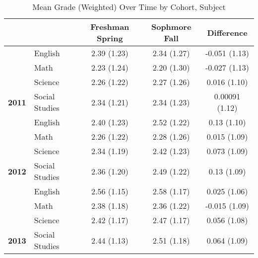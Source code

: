 \begin{table}[!h]

\caption{\label{tab:table_grade_desc}Mean Grade (Weighted) Over Time by Cohort, Subject}
\centering
\begin{tabular}[t]{>{}llccc}
\toprule
 &  & Freshman Spring & Sophmore Fall & Difference\\
\midrule
 & English & 2.39 (1.23) & 2.34 (1.27) & -0.051 (1.13)\\

 & Math & 2.23 (1.24) & 2.20 (1.30) & -0.027 (1.13)\\

 & Science & 2.26 (1.22) & 2.27 (1.26) & 0.016 (1.10)\\

\multirow{-4}{*}{\raggedright\arraybackslash \textbf{2011}} & Social Studies & 2.34 (1.21) & 2.34 (1.23) & 0.00091 (1.12)\\
\cmidrule{1-5}
 & English & 2.40 (1.23) & 2.52 (1.22) & 0.13 (1.10)\\

 & Math & 2.26 (1.22) & 2.28 (1.26) & 0.015 (1.09)\\

 & Science & 2.34 (1.19) & 2.42 (1.23) & 0.073 (1.09)\\

\multirow{-4}{*}{\raggedright\arraybackslash \textbf{2012}} & Social Studies & 2.36 (1.20) & 2.49 (1.22) & 0.13 (1.09)\\
\cmidrule{1-5}
 & English & 2.56 (1.15) & 2.58 (1.17) & 0.025 (1.06)\\

 & Math & 2.38 (1.18) & 2.36 (1.22) & -0.015 (1.09)\\

 & Science & 2.42 (1.17) & 2.47 (1.17) & 0.056 (1.08)\\

\multirow{-4}{*}{\raggedright\arraybackslash \textbf{2013}} & Social Studies & 2.44 (1.13) & 2.51 (1.18) & 0.064 (1.09)\\
\bottomrule
\end{tabular}
\end{table}
